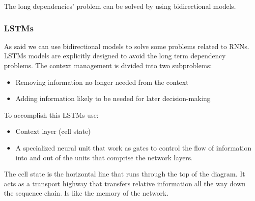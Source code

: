 \vspace{10pt}

The long dependencies' problem can be solved by using bidirectional models. 


\subsubsection{LSTMs}

As said we can use bidirectional models to solve some problems related to RNNs. LSTMs models are explicitly designed to avoid the long term dependency problems. The context management is divided into two subproblems:
\begin{itemize}
    \item Removing information no longer needed from the context
    \item Adding information likely to be needed for later decision-making
\end{itemize}

To accomplish this LSTMs use:
\begin{itemize}
    \item Context layer (cell state)
    \item A specialized neural unit that work as gates to control the flow of information into and out of the units that comprise the network layers. 
\end{itemize}

The cell state is the horizontal line that runs through the top of the diagram. It acts as a transport highway that transfers relative information all the way down the sequence chain. Is like the memory of the network. 

\vspace{10pt}

